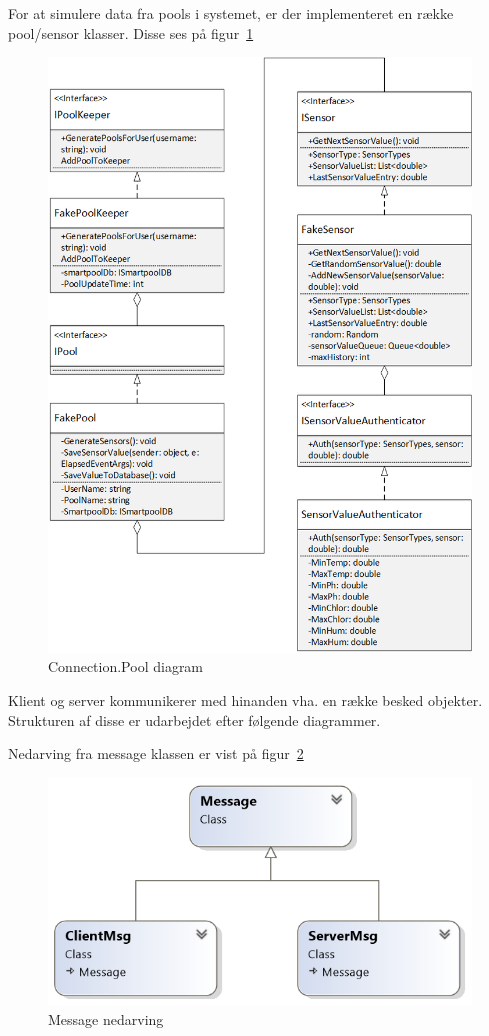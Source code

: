 For at simulere data fra pools i systemet, er der implementeret en række pool/sensor klasser. Disse ses på figur~\ref{fig:ConnectionPool}
\begin{figure}
	\centering
	\includegraphics[width=0.8\linewidth]{figs/connection/ConnectionPool.png}
	\caption{Connection.Pool diagram}
	\label{fig:ConnectionPool}
\end{figure}

Klient og server kommunikerer med hinanden vha. en række besked objekter. Strukturen af disse er udarbejdet efter følgende diagrammer.

Nedarving fra message klassen er vist på figur~\ref{fig:MessageUML}
\begin{figure}
	\centering
	\includegraphics[width=0.6\linewidth]{figs/connection/MessageUML.png}
	\caption{Message nedarving}
	\label{fig:MessageUML}
\end{figure}

